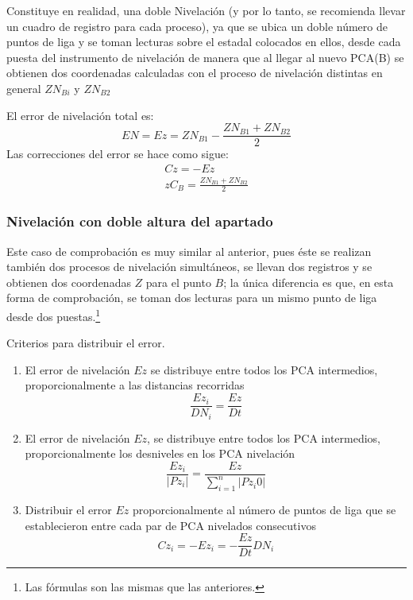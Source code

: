 Constituye en realidad, una doble Nivelación (y por lo tanto, se recomienda llevar un cuadro de registro para cada proceso), ya que se ubica un doble número de puntos de liga y se toman lecturas sobre el estadal colocados en ellos, desde cada puesta del instrumento de nivelación de manera que al llegar al nuevo PCA(B) se obtienen dos coordenadas calculadas con el proceso de nivelación distintas en general $ZN_{Bi}$ y $ZN_{B2}$

El error de nivelación total es:
\begin{equation}
    EN=Ez=ZN_{B1}-\frac{ZN_{B1}+ZN_{B2}}{2}
\end{equation}
Las correcciones del error se hace como sigue:
\begin{align}
    Cz=-Ez\\
    zC_B= \frac{ZN_{B1}+ZN_{B2}}{2}
\end{align}

\subsubsection{Nivelación con doble altura del apartado}

Este caso de comprobación es muy similar al anterior, pues éste se realizan también dos procesos de nivelación simultáneos, se llevan dos registros y se obtienen dos coordenadas $Z$ para el punto $B$; la única diferencia es que, en esta forma de comprobación, se toman dos lecturas para un mismo punto de liga desde dos puestas.\footnote{Las fórmulas son las mismas que las anteriores.}

Criterios para distribuir el error.
\begin{enumerate}
    \item El error de nivelación $Ez$ se distribuye entre todos los PCA intermedios, proporcionalmente a las distancias recorridas
    \begin{equation}
        \frac{Ez_i}{DN_i}= \frac{Ez}{Dt}
    \end{equation}

    \item El error de nivelación $Ez$, se distribuye entre todos los PCA intermedios, proporcionalmente los desniveles en los PCA nivelación 
    \begin{equation}
        \frac{Ez_i}{\left\lvert Pz_i\right\rvert }=\frac{Ez}{\sum_{i=1}^n\left\lvert Pz_i0\right\rvert }
    \end{equation}
    \item Distribuir el error $Ez$ proporcionalmente al número de puntos de liga que se establecieron entre cada par de PCA nivelados consecutivos
    \begin{equation}
        Cz_i=-Ez_i=-\frac{Ez}{Dt}DN_i
    \end{equation}
\end{enumerate}

